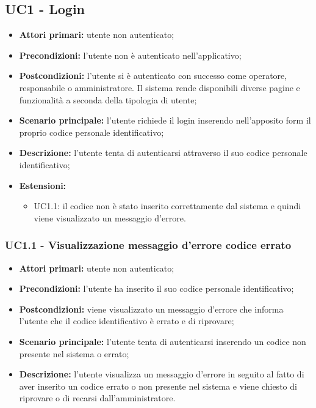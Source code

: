 \subsection{UC1 - Login}

\begin{itemize}
	\item 	\textbf{Attori primari:} utente non autenticato;
	\item 	\textbf{Precondizioni:} l'utente non è autenticato nell'applicativo;
	\item 	\textbf{Postcondizioni:}	l'utente si è autenticato con successo come operatore, responsabile o amministratore. Il sistema rende disponibili diverse pagine e funzionalità a seconda della tipologia di utente;
	\item 	\textbf{Scenario principale:} l'utente richiede il login inserendo nell'apposito form il proprio codice personale identificativo;
	\item 	\textbf{Descrizione:} l'utente tenta di autenticarsi attraverso il suo codice personale identificativo;
	\item 	\textbf{Estensioni:} 
		\begin{itemize}
			\item UC1.1: il codice non è stato inserito correttamente dal sistema e quindi viene visualizzato un messaggio d'errore.
		\end{itemize}
\end{itemize}
\subsubsection{UC1.1 - Visualizzazione messaggio d'errore codice errato}

\begin{itemize}
	\item 	\textbf{Attori primari:} utente non autenticato;
	\item 	\textbf{Precondizioni:} l'utente ha inserito il suo codice personale identificativo;
	\item 	\textbf{Postcondizioni:} viene visualizzato un messaggio d'errore che informa l'utente che il codice identificativo è errato e di riprovare;
	\item 	\textbf{Scenario principale:} l'utente tenta di autenticarsi inserendo un codice non presente nel sistema o errato;
	\item 	\textbf{Descrizione:} l'utente visualizza un messaggio d'errore in seguito al fatto di aver inserito un codice errato o non presente nel sistema e viene chiesto di riprovare o di recarsi dall'amministratore.
	
\end{itemize}

